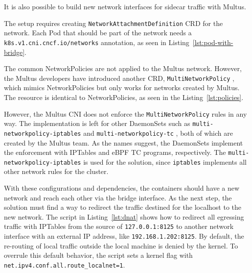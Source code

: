 \documentclass[english, 12pt, a4paper, sci, utf8, a-2b, online]{aaltothesis}
\begin{document}
It is also possible to build new network interfaces for sidecar traffic with Multus.



The setup requires creating \texttt{NetworkAttachmentDefinition} CRD for the network. Each Pod that should be part of the network needs a \texttt{k8s.v1.cni.cncf.io/networks} annotation, as seen in Listing~\ref{lst:pod-with-bridge}.



The common NetworkPolicies are not applied to the Multus network. However, the Multus developers have introduced another CRD, \texttt{MultiNetworkPolicy} \cite{multi-network-policy}, which mimics NetworkPolicies but only works for networks created by Multus. The resource is identical to NetworkPolicies, as seen in the Listing~\ref{lst:policies}.



However, the Multus CNI does not enforce the \texttt{MultiNetworkPolicy} rules in any way. The implementation is left for other DaemonSets such as \texttt{multi-networkpolicy-iptables} \cite{multi-network-policy-iptables} and \texttt{multi-networkpolicy-tc} \cite{multi-network-policy-tc}, both of which are created by the Multus team. As the names suggest, the DaemonSets implement the enforcement with IPTables and eBPF TC programs, respectively. The \texttt{multi-networkpolicy-iptables} is used for the solution, since \texttt{iptables} implements all other network rules for the cluster.


With these configurations and dependencies, the containers should have a new network and reach each other via the bridge interface. As the next step, the solution must find a way to redirect the traffic destined for the localhost to the new network. The script in Listing~\ref{lst:dnat} shows how to redirect all egressing traffic with IPTables from the source of \texttt{127.0.0.1:8125} to another network interface with an external IP address, like \texttt{192.168.1.202:8125}. By default, the re-routing of local traffic outside the local machine is denied by the kernel. To overrule this default behavior, the script sets a kernel flag with \lstinline{net.ipv4.conf.all.route_localnet=1}.
\end{document}
